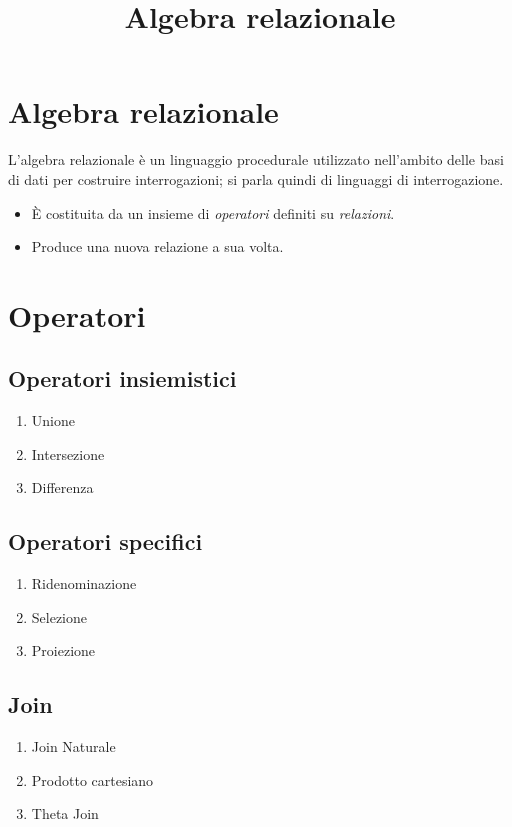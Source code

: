 \documentclass{article}
\title{Algebra relazionale}
\author{}
\date{}
\begin{document}
\maketitle

\section{Algebra relazionale}

L'algebra relazionale è un linguaggio procedurale utilizzato nell'ambito delle basi di dati per costruire interrogazioni; si parla quindi di linguaggi di interrogazione.

\begin{itemize}
  \item È costituita da un insieme di \textit{operatori} definiti su \textit{relazioni}.
  \item Produce una nuova relazione a sua volta.
\end{itemize}

\section{Operatori}

\subsection{Operatori insiemistici}
\begin{enumerate}
  \item Unione
  \item Intersezione
  \item Differenza
\end{enumerate}

\subsection*{Operatori specifici}
\begin{enumerate}
  \item Ridenominazione
  \item Selezione
  \item Proiezione
\end{enumerate}

\subsection*{Join}
\begin{enumerate}
  \item Join Naturale
  \item Prodotto cartesiano
  \item Theta Join
\end{enumerate}
\end{document}
